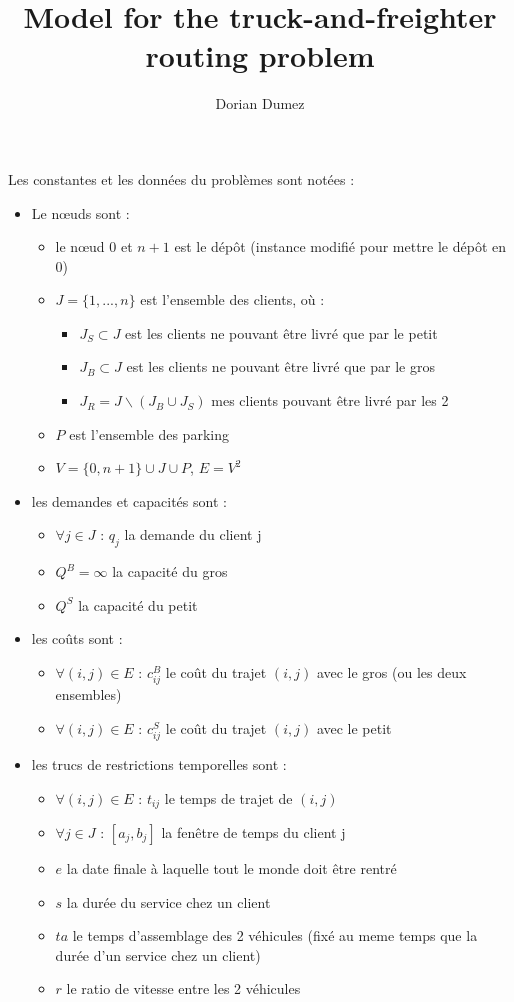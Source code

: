 \documentclass[12pt,a4paper,fleqn]{article}
\title{Model for the truck-and-freighter routing problem}
\author{Dorian Dumez}
\begin{document}
\maketitle

Les constantes et les données du problèmes sont notées :
\begin{itemize}
\item Le nœuds sont :
\begin{itemize}
\item le nœud 0 et $n+1$ est le dépôt (instance modifié pour mettre le dépôt en 0)
\item $J = \{1,...,n\}$ est l'ensemble des clients, où :
\begin{itemize}
\item $J_S \subset J$ est les clients ne pouvant être livré que par le petit
\item $J_B \subset J$ est les clients ne pouvant être livré que par le gros
\item $J_R = J \backslash (J_B \cup J_S)$ mes clients pouvant être livré par les 2
\end{itemize}
\item $P$ est l'ensemble des parking
\item $V = \{0, n+1\} \cup J \cup P$, $E = V^2$
\end{itemize}
\item les demandes et capacités sont :
\begin{itemize}
\item $\forall j \in J \text{ : } q_j$ la demande du client j
\item $Q^B = \infty$ la capacité du gros
\item $Q^S$ la capacité du petit
\end{itemize}
\item les coûts sont :
\begin{itemize}
\item $\forall (i,j) \in E \text{ : } c^B_{ij}$ le coût du trajet $(i,j)$ avec le gros (ou les deux ensembles)
\item $\forall (i,j) \in E \text{ : } c^S_{ij}$ le coût du trajet $(i,j)$ avec le petit
\end{itemize} 
\item les trucs de restrictions temporelles sont :
\begin{itemize}
\item $\forall (i,j) \in E \text{ : } t_{ij}$ le temps de trajet de $(i,j)$
\item $\forall j \in J \text{ : } [a_j,b_j]$ la fenêtre de temps du client j
\item $e$ la date finale à laquelle tout le monde doit être rentré
\item $s$ la durée du service chez un client
\item $ta$ le temps d'assemblage des 2 véhicules (fixé au meme temps que la durée d'un service chez un client)
\item $r$ le ratio de vitesse entre les 2 véhicules
\end{itemize}
\end{itemize}
\end{document}
